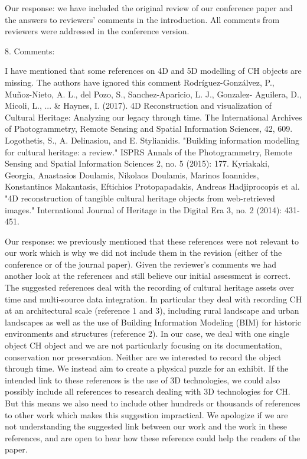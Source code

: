 \documentclass[acmlarge,screen,dvipsnames]{acmart}
\begin{document}
\greenBegin

Our response: we have included the original review of our conference paper and the answers to reviewers’ comments  in the introduction. All comments from reviewers were addressed in the conference version.

\greenEnd


8. Comments:

I have mentioned that some references on 4D and 5D modelling of CH objects are missing. The authors have ignored this comment
Rodríguez-Gonzálvez, P., Muñoz-Nieto, A. L., del Pozo, S., Sanchez-Aparicio, L. J., Gonzalez- Aguilera, D., Micoli, L., ... \& Haynes, I. (2017). 4D Reconstruction and visualization of Cultural Heritage: Analyzing our legacy through time. The International Archives of Photogrammetry,
Remote Sensing and Spatial Information Sciences, 42, 609.
Logothetis, S., A. Delinasiou, and E. Stylianidis. "Building information modelling for cultural heritage: a review." ISPRS Annals of the Photogrammetry, Remote Sensing and Spatial Information Sciences 2, no. 5 (2015): 177.
Kyriakaki, Georgia, Anastasios Doulamis, Nikolaos Doulamis, Marinos Ioannides, Konstantinos Makantasis, Eftichios Protopapadakis, Andreas Hadjiprocopis et al. "4D reconstruction of tangible cultural heritage objects from web-retrieved images." International Journal of Heritage in the Digital Era 3, no. 2 (2014): 431-451.

\greenBegin

Our response: we previously mentioned that these references were not relevant to our work which is why we did not include them in the revision (either of the conference or of the journal paper). Given the reviewer's comments we  had another look at the references and still believe our initial assessment is correct. The suggested references deal with the recording of cultural heritage assets over time and multi-source data integration. In particular they deal with recording CH at an architectural scale (reference 1 and 3), including rural landscape and urban landscapes as well as the use of Building Information Modeling (BIM) for historic environments and structures (reference 2). In our case, we deal with one single object CH object and we are not particularly focusing on its documentation, conservation nor preservation. Neither are we interested to record the object through time. We instead aim to create a physical puzzle for an exhibit. If the intended link to these references is the use of 3D technologies, we could also possibly include all references to research dealing with 3D technologies for CH. But this means we also need to include other hundreds or thousands of references to other work which makes this suggestion impractical. We apologize if we are not understanding the suggested link between our work and the work in these references, and are open to hear how these reference could help the readers of the paper.
\end{document}
